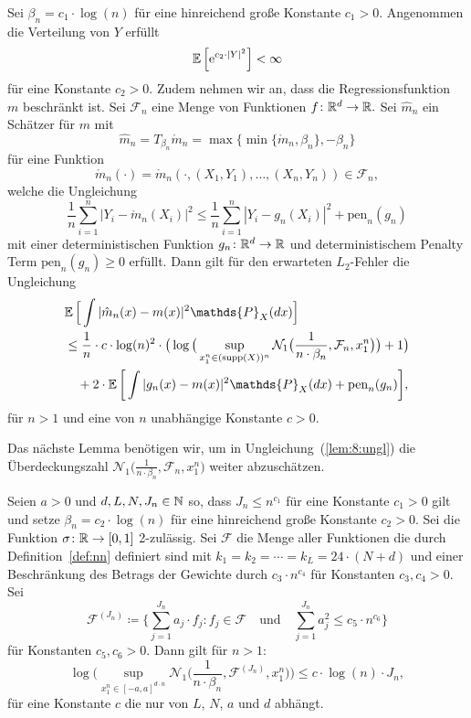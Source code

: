   \begin{lem}
  \label{lem:8}
Sei $\beta_n = c_1 \cdot \log(n)$ für eine hinreichend große Konstante $c_1 > 0$. Angenommen die Verteilung von $Y$ erfüllt 
$$ \mathbb{E}\,\Big[\mathrm{e}^{c_2 \cdot |Y|^2}\Big] < \infty$$
für eine Konstante $c_2 > 0.$ Zudem nehmen wir an, dass die Regressionsfunktion~$m$ beschränkt ist. Sei $\mathcal{F}_n$ eine Menge von Funktionen $f\colon \mathbb{R}^d \to \mathbb{R}.$ Sei $\hat{m}_n$ ein Schätzer für $m$ mit
$$\hat{m}_n = T_{\beta_n}\mathring{m}_n = \max\big\{\min\{\mathring{m}_n, \beta_n\}, -\beta_n\big\}$$ 
für eine Funktion
$$\mathring{m}_n(\cdot) = \mathring{m}_n(\cdot,(X_1, Y_1),\dots,(X_n, Y_n)) \in \mathcal{F}_n,$$
welche die Ungleichung
\begin{equation}
\label{lem:8:bed:1}
\frac{1}{n} \sum_{i = 1}^n |Y_i - \mathring{m}_n(X_i)|^2 \leq \frac{1}{n}\sum_{i = 1}^n |Y_i - g_{n}(X_i)|^2 + \mathrm{pen}_n(g_n)
\end{equation}
mit einer deterministischen Funktion $g_{n}\colon \mathbb{R}^d \to \mathbb{R}$ und deterministischem Penalty Term $\mathrm{pen}_n(g_{n}) \geq 0$ erfüllt.
Dann gilt für den erwarteten $L_2$-Fehler die Ungleichung
\begin{equation}
\label{lem:8:ungl}
\begin{split}
& \E \Big[\int |\hat{m}_n(x) - m(x)|^2 \mathds{P}_X(dx)\Big] \\
& \leq \frac{1}{n} \cdot c \cdot \log(n)^2 \cdot \big(\log\big(\sup_{x_1^n \in (\supp(X))^n}\mathcal{N}_1\big(\frac{1}{n \cdot \beta_n},\mathcal{F}_n,x_1^n\big)\big) + 1\big) \\
& \quad + 2 \cdot \E\bigg[\int |g_{n}(x) - m(x)|^2 \mathds{P}_X(dx) + \mathrm{pen}_n(g_{n})\bigg],
\end{split}
\end{equation}
für $n > 1$ und eine von $n$ unabhängige Konstante $c > 0$.
  \end{lem}
Das nächste Lemma benötigen wir, um in Ungleichung~(\ref{lem:8:ungl}) die Überdeckungszahl $\mathcal{N}_1\big(\frac{1}{n \cdot \beta_n},\mathcal{F}_n,x_1^n\big)$ weiter abzuschätzen.
\begin{lem}
\label{lem:9}
Seien $a > 0$ und $d, L, N, J_n \in \mathbb{N}$ so, dass $J_n \leq n^{c_{1}}$ für eine Konstante $c_1 > 0$ gilt und setze $\beta_n = c_2 \cdot \log(n)$ für eine hinreichend große Konstante $c_2 > 0.$ 
Sei die Funktion $\sigma\colon \mathbb{R} \to [0, 1]$ 2-zulässig. Sei $\mathcal{F}$ die Menge aller Funktionen die durch Definition~\ref{def:nn} definiert sind mit $k_1 = k_2 = \cdots = k_L = 24 \cdot (N + d)$ und einer Beschränkung des Betrags der Gewichte durch $c_{3} \cdot n^{c_{4}}$ für Konstanten $c_3, c_4 > 0$. Sei
$$ \mathcal{F}^{(J_n)} \coloneqq \biggl\{\sum_{j = 1}^{J_n} a_j \cdot f_j : f_j \in \mathcal{F} \quad \text{und} \quad \sum_{j = 1}^{J_n} a_j^2 \leq c_{5} \cdot n^{c_{6}}\biggr\}$$ für Konstanten $c_5, c_6 > 0.$
Dann gilt für $n > 1$:
$$\log\bigg(\sup_{x_1^n\in[-a,a]^{d \cdot n}} \mathcal{N}_1\bigg(\frac{1}{n \cdot \beta_n}, \mathcal{F}^{(J_n)},x_1^n\bigg)\bigg) \leq c \cdot \log(n) \cdot J_n,$$
für eine Konstante $c$ die nur von $L$, $N$, $a$ und $d$ abhängt.
\end{lem}

